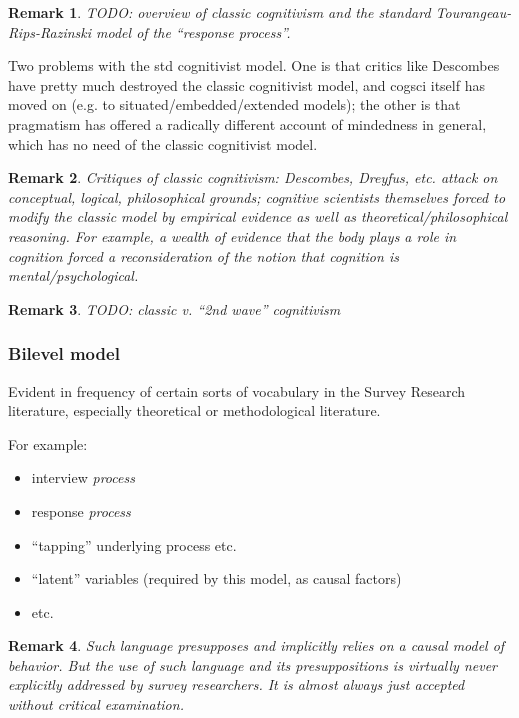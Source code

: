 \documentclass[11pt,twoside]{article}
\newtheorem{remark}{Remark}
\newcommand{\SR}{Survey Research}
\begin{document}
\begin{remark}
  TODO: overview of classic cognitivism and the standard
  Tourangeau-Rips-Razinski model of the ``response process''.
\end{remark}

Two problems with the std cognitivist model.  One is that critics like
Descombes have pretty much destroyed the classic cognitivist model,
and cogsci itself has moved on (e.g. to situated/embedded/extended
models); the other is that pragmatism has offered a radically
different account of mindedness in general, which has no need of the
classic cognitivist model.

\begin{remark}
  Critiques of classic cognitivism: Descombes, Dreyfus, etc. attack on
  conceptual, logical, philosophical grounds; cognitive scientists
  themselves forced to modify the classic model by empirical evidence
  as well as theoretical/philosophical reasoning.  For example, a
  wealth of evidence that the body plays a role in cognition forced a
  reconsideration of the notion that cognition is mental/psychological.
\end{remark}

\begin{remark}
  TODO: classic v. ``2nd wave'' cognitivism
\end{remark}

\subsubsection{Bilevel model}

Evident in frequency of certain sorts of vocabulary in the \SR{}
literature, especially theoretical or methodological literature.

For example:

\begin{itemize}
\item interview \textit{process}
\item response \textit{process}
\item ``tapping'' underlying process etc.
\item ``latent'' variables (required by this model, as causal factors)
\item etc.
\end{itemize}

\begin{remark}
  Such language presupposes and implicitly relies on a causal model of
  behavior.  But the use of such language and its presuppositions is
  virtually never explicitly addressed by survey researchers.  It is
  almost always just accepted without critical examination.
\end{remark}
\end{document}
